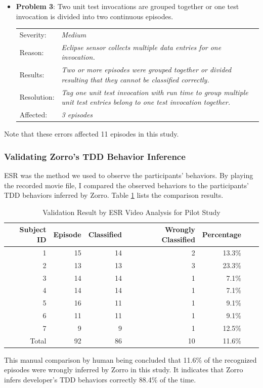 \begin{itemize}
\item \textbf{Problem 3}: Two unit test invocations are grouped
together or one test invocation is divided into two continuous
episodes.
  \begin{tabular}{lp{10cm}}
    Severity: & \small\textit{Medium}\\
    Reason: & \small\textit{Eclipse sensor collects multiple data 
              entries for one invocation.}\\
    Results: & \small\textit{Two or more episodes were grouped 
               together or divided resulting that they cannot be 
               classified correctly.} \\
    Resolution: & \small\textit{Tag one unit test invocation with run 
                  time to group multiple unit test entries belong to 
                  one test invocation together.} \\
    Affected: & \small\textit{3 episodes}
  \end{tabular}
\end{itemize}

\noindent Note that these errors affected 11 episodes in this study. 

\subsubsection{Validating Zorro's TDD Behavior Inference}
ESR was the method we used to observe the participants' behaviors. By
playing the recorded movie file, I compared the observed behaviors to
the participants' TDD behaviors inferred by Zorro. Table
\ref{tab:EsrPilotStudy} lists the comparison results.
\begin{table}[htbp]
\centering
  \caption{Validation Result by ESR Video Analysis for Pilot Study}\label{tab:EsrPilotStudy}  
  \begin{tabular}{|r|r|r|r|r|r|r|}
  \hline
    Subject ID & Episode & Classified & Wrongly Classified & Percentage \\ \hline
    1          & 15 &  14 &  2 & 13.3\% \\ \hline
    2          & 13 &  13 &  3 & 23.3\% \\ \hline
    3          & 14 &  14 &  1 &  7.1\% \\ \hline
    4          & 14 &  14 &  1 &  7.1\% \\ \hline
    5          & 16 &  11 &  1 &  9.1\% \\ \hline
    6          & 11 &  11 &  1 &  9.1\% \\ \hline
    7          &  9 &   9 &  1 & 12.5\% \\ \hline \hline
    Total      & 92 &  86 & 10 & 11.6\% \\ 
  \hline
  \end{tabular}
\end{table}
This manual comparison by human being concluded that 11.6\% of the
recognized episodes were wrongly inferred by Zorro in this study. It
indicates that Zorro infers developer's TDD behaviors correctly 88.4\%
of the time.

